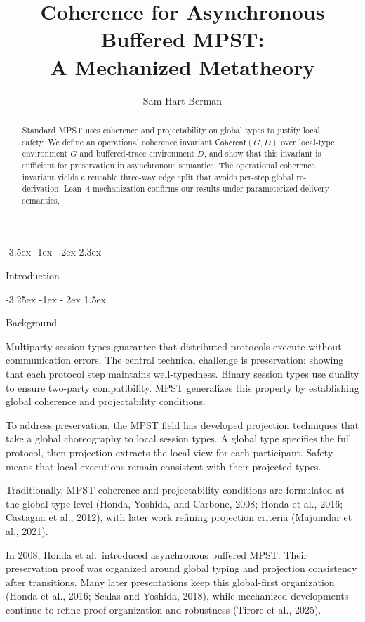 \documentclass[a4paper,10pt,twocolumn,english]{article}
\title{Coherence for Asynchronous Buffered MPST:\\A Mechanized Metatheory}
\author{Sam Hart Berman}
\date{\empty}
\makeatletter
\renewcommand{\section}{\@startsection{section}{1}{\z@}%
  {-3.5ex \@plus -1ex \@minus -.2ex}%
  {2.3ex}%
  {\raggedright\normalfont\large\bfseries}}
\renewcommand{\subsection}{\@startsection{subsection}{2}{\z@}%
  {-3.25ex \@plus -1ex \@minus -.2ex}%
  {1.5ex}%
  {\raggedright\normalfont\normalsize\bfseries}}
\numberwithin{equation}{section}
\theoremstyle{paperdef}
\theoremstyle{paperplain}
\theoremstyle{paperdef}
\theoremstyle{paperremark}
\newcommand{\Coherent}{\ensuremath{\mathsf{Coherent}}}
\makeatother
\begin{document}
\maketitle

\begin{abstract}
	Standard MPST uses coherence and projectability on global types to justify local safety. We define
	an operational coherence invariant $\Coherent(G,D)$ over local-type environment $G$ and buffered-trace
	environment $D$, and show that this invariant is sufficient for preservation in asynchronous semantics. The
	operational coherence invariant yields a reusable three-way edge split that avoids per-step global
	re-derivation. Lean~4 mechanization confirms our results under parameterized delivery semantics.
\end{abstract}

\section{Introduction}
\label{sec:introduction}

\subsection{Background}

Multiparty session types guarantee that distributed protocols execute without communication errors.
The central technical challenge is preservation: showing that each protocol step maintains
well-typedness. Binary session types use duality to ensure two-party compatibility. MPST generalizes
this property by establishing global coherence and projectability conditions.

To address preservation, the MPST field has developed projection techniques that take a global
choreography to local session types. A global type specifies the full protocol, then projection
extracts the local view for each participant. Safety means that local executions remain consistent
with their projected types.

Traditionally, MPST coherence and projectability conditions are formulated at the global-type level (Honda,
Yoshida, and Carbone, 2008; Honda et al., 2016; Castagna et al., 2012), with later work
refining projection criteria (Majumdar et al., 2021).

In 2008, Honda et al.\ introduced asynchronous buffered MPST. Their preservation proof was organized
around global typing and projection consistency after transitions. Many later presentations keep this
global-first organization (Honda et al., 2016; Scalas and Yoshida, 2018), while
mechanized developments continue to refine proof organization and robustness (Tirore et al., 2025).
\end{document}
